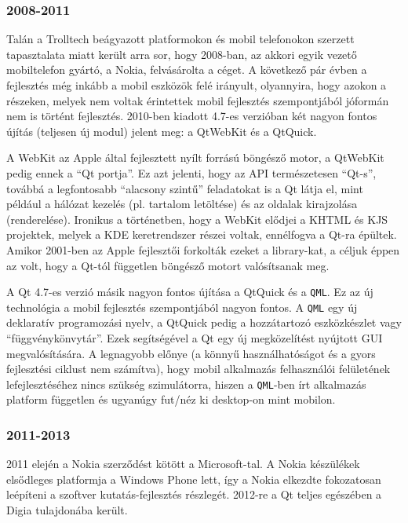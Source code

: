 \documentclass[12pt]{report}
\begin{document}
\subsubsection{2008-2011}
Talán a Trolltech beágyazott platformokon és mobil telefonokon szerzett tapasztalata
miatt került arra sor, hogy 2008-ban, az akkori egyik vezető mobiltelefon gyártó, a Nokia,
felvásárolta a céget. A következő pár évben a fejlesztés még inkább a mobil eszközök
felé irányult, olyannyira, hogy azokon a részeken, melyek nem voltak érintettek mobil
fejlesztés szempontjából jóformán nem is történt fejlesztés.
2010-ben kiadott 4.7-es verzióban két nagyon fontos újítás (teljesen új modul) jelent meg:
a QtWebKit és a QtQuick.

A WebKit az Apple által fejlesztett nyílt forrású böngésző motor, a QtWebKit pedig ennek
a ``Qt portja''. Ez azt jelenti, hogy az API természetesen ``Qt-s'', továbbá a legfontosabb
``alacsony szintű'' feladatokat is a Qt látja el, mint például a hálózat kezelés
(pl. tartalom letöltése) és az oldalak kirajzolása (renderelése).
Ironikus a történetben, hogy a WebKit elődjei a KHTML és KJS projektek, melyek a KDE
keretrendszer részei voltak, ennélfogva a Qt-ra épültek. Amikor 2001-ben az Apple
fejlesztői forkolták ezeket a library-kat, a céljuk éppen az volt, hogy a Qt-tól független
böngésző motort valósítsanak meg.

A Qt 4.7-es verzió másik nagyon fontos újítása a QtQuick és a \texttt{QML}.
Ez az új technológia a mobil fejlesztés szempontjából nagyon fontos. A \texttt{QML} egy
új deklaratív programozási nyelv, a QtQuick pedig a hozzátartozó eszközkészlet vagy
``függvénykönvytár''. Ezek segítségével a Qt egy új megközelítést nyújtott GUI
megvalósítására. A legnagyobb előnye (a könnyű használhatóságot és a gyors fejlesztési
ciklust nem számítva), hogy mobil alkalmazás felhasználói felületének
lefejlesztéséhez nincs szükség szimulátorra, hiszen a \texttt{QML}-ben írt alkalmazás
platform független és ugyanúgy fut/néz ki desktop-on mint mobilon.

\subsubsection{2011-2013}
2011 elején a Nokia szerződést kötött a Microsoft-tal. A Nokia készülékek elsődleges
platformja a Windows Phone lett, így a Nokia elkezdte fokozatosan leépíteni a
szoftver kutatás-fejlesztés részlegét. 2012-re a Qt teljes egészében a Digia
tulajdonába került.
\end{document}
